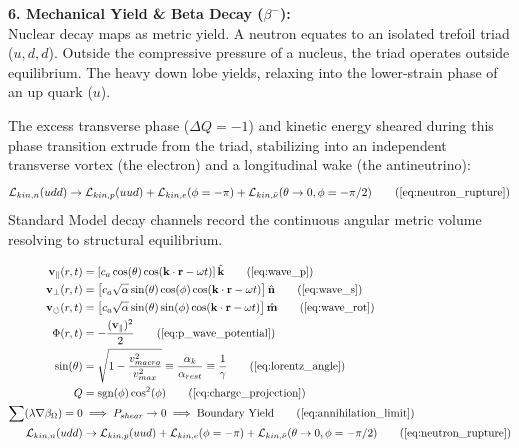 \textbf{6. Mechanical Yield \& Beta Decay ($\beta^-$):} \\
Nuclear decay maps as metric yield. A neutron equates to an isolated trefoil triad ($u, d, d$). Outside the compressive pressure of a nucleus, the triad operates outside equilibrium. The heavy down lobe yields, relaxing into the lower-strain phase of an up quark ($u$). 

The excess transverse phase ($\Delta Q = -1$) and kinetic energy sheared during this phase transition extrude from the triad, stabilizing into an independent transverse vortex (the electron) and a longitudinal wake (the antineutrino):
\begin{equation}
    \mathcal{L}_{kin, n}(udd) \to \mathcal{L}_{kin, p}(uud) + \mathcal{L}_{kin, e}(\phi=-\pi) + \mathcal{L}_{kin, \bar{\nu}}(\theta \to 0, \phi = -\pi/2) \tag{\ref{eq:neutron_rupture}}
\end{equation}
Standard Model decay channels record the continuous angular metric volume resolving to structural equilibrium. 

\begin{tcolorbox}[recallbox, title={\ref{box:wave_mechanics}. Continuous Wave Mechanics \& Topological Phase States}] 
\begin{align}
    \mathbf{v}_{\parallel}(r,t) &= \left[ c_a \cos(\theta) \cos(\mathbf{k} \cdot \mathbf{r} - \omega t) \right] \hat{\mathbf{k}} \tag{\ref{eq:wave_p}} \\
    \mathbf{v}_{\perp}(r,t) &= \left[ c_a \sqrt{\alpha} \sin(\theta)\cos(\phi) \cos(\mathbf{k} \cdot \mathbf{r} - \omega t) \right] \hat{\mathbf{n}} \tag{\ref{eq:wave_s}} \\
    \mathbf{v}_{\circlearrowleft}(r,t) &= \left[ c_a \sqrt{\alpha} \sin(\theta)\sin(\phi) \cos(\mathbf{k} \cdot \mathbf{r} - \omega t) \right] \hat{\mathbf{m}} \tag{\ref{eq:wave_rot}} \\
    \Phi(r,t) &= - \frac{(\mathbf{v}_{\parallel})^2}{2} \tag{\ref{eq:p_wave_potential}} \\
    \sin(\theta) &= \sqrt{1 - \frac{v_{macro}^2}{v_{max}^2}} \equiv \frac{\alpha_k}{\alpha_{rest}} \equiv \frac{1}{\gamma} \tag{\ref{eq:lorentz_angle}} \\
    Q &= \text{sgn}(\phi) \cos^2(\phi) \tag{\ref{eq:charge_projection}} \\
    \sum (\lambda \nabla \beta_\Omega) = 0 &\implies P_{shear} \to 0 \implies \text{Boundary Yield} \tag{\ref{eq:annihilation_limit}} \\
    \mathcal{L}_{kin, n}(udd) &\to \mathcal{L}_{kin, p}(uud) + \mathcal{L}_{kin, e}(\phi=-\pi) + \mathcal{L}_{kin, \bar{\nu}}(\theta \to 0, \phi = -\pi/2) \tag{\ref{eq:neutron_rupture}}
\end{align}
\end{tcolorbox}







